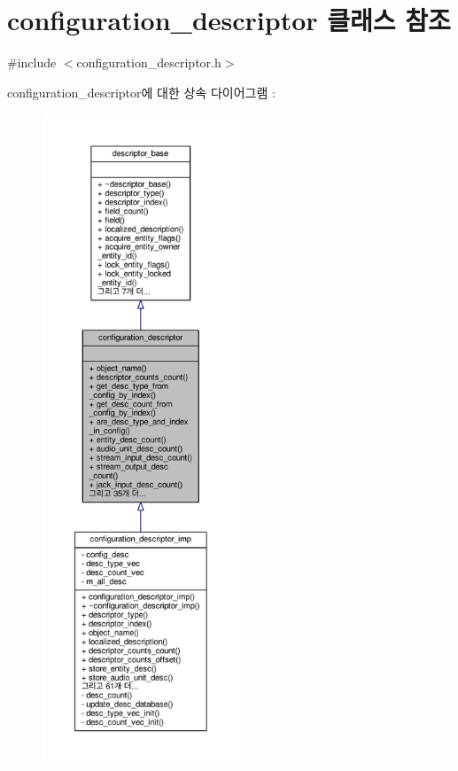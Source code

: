 \hypertarget{classavdecc__lib_1_1configuration__descriptor}{}\section{configuration\+\_\+descriptor 클래스 참조}
\label{classavdecc__lib_1_1configuration__descriptor}


{\ttfamily \#include $<$configuration\+\_\+descriptor.\+h$>$}



configuration\+\_\+descriptor에 대한 상속 다이어그램 \+: 
\nopagebreak
\begin{figure}[H]
\begin{center}
\leavevmode
\includegraphics[height=550pt]{classavdecc__lib_1_1configuration__descriptor__inherit__graph}
\end{center}
\end{figure}


